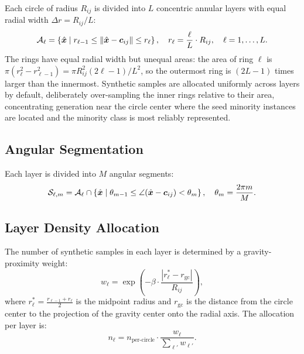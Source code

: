 Each circle of radius $R_{ij}$ is divided into $L$ concentric annular layers with equal radial width $\Delta r = R_{ij}/L$:
\begin{equation}
    \mathcal{A}_\ell = \left\{\hat{\bm{x}} \;\middle|\; r_{\ell-1} \leq \|\hat{\bm{x}} - \bm{c}_{ij}\| \leq r_\ell\right\}, \quad r_\ell = \frac{\ell}{L} \cdot R_{ij}, \quad \ell = 1, \ldots, L.
    \label{eq:layers}
\end{equation}
The rings have equal radial width but unequal areas: the area of ring $\ell$ is $\pi(r_\ell^2 - r_{\ell-1}^2) = \pi R_{ij}^2 (2\ell-1)/L^2$, so the outermost ring is $(2L-1)$ times larger than the innermost.
Synthetic samples are allocated uniformly across layers by default, deliberately over-sampling the inner rings relative to their area, concentrating generation near the circle center where the seed minority instances are located and the minority class is most reliably represented.

\subsection{Angular Segmentation}

Each layer is divided into $M$ angular segments:
\begin{equation}
    \mathcal{S}_{\ell,m} = \mathcal{A}_\ell \cap \left\{\hat{\bm{x}} \;\middle|\; \theta_{m-1} \leq \angle(\hat{\bm{x}} - \bm{c}_{ij}) < \theta_m\right\}, \quad \theta_m = \frac{2\pi m}{M}.
    \label{eq:segments}
\end{equation}

\subsection{Layer Density Allocation}

The number of synthetic samples in each layer is determined by a gravity-proximity weight:
\begin{equation}
    w_\ell = \exp\!\left(-\beta \cdot \frac{|r_\ell^* - r_{\text{gc}}|}{R_{ij}}\right),
    \label{eq:layer_weight}
\end{equation}
where $r_\ell^* = \frac{r_{\ell-1} + r_\ell}{2}$ is the midpoint radius and $r_{\text{gc}}$ is the distance from the circle center to the projection of the gravity center onto the radial axis.
The allocation per layer is:
\begin{equation}
    n_\ell = n_{\text{per-circle}} \cdot \frac{w_\ell}{\sum_{\ell'} w_{\ell'}}.
    \label{eq:layer_alloc}
\end{equation}


